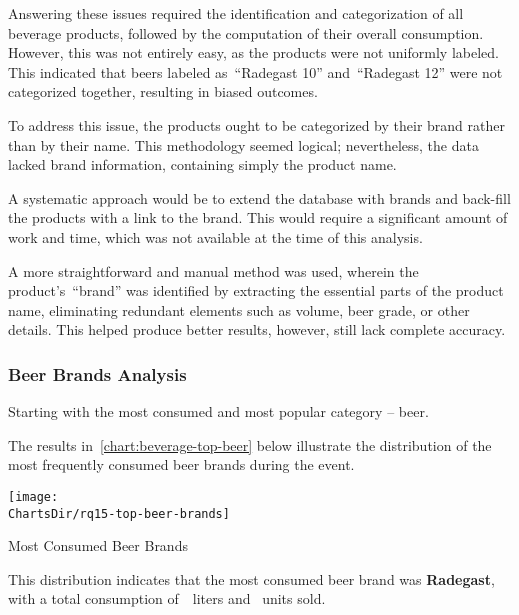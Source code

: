 Answering these issues required the identification and categorization of all beverage products, followed by the computation of their overall consumption.
However, this was not entirely easy, as the products were not uniformly labeled.
This indicated that beers labeled as~\enquote{Radegast 10} and~\enquote{Radegast 12} were not categorized together, resulting in biased outcomes.

To address this issue, the products ought to be categorized by their brand rather than by their name.
This methodology seemed logical; nevertheless, the data lacked brand information, containing simply the product name.

A systematic approach would be to extend the database with brands and back-fill the products with a link to the brand.
This would require a significant amount of work and time, which was not available at the time of this analysis.

A more straightforward and manual method was used, wherein the product's~\enquote{brand} was identified by extracting the essential parts of the product name, eliminating redundant elements such as volume, beer grade, or other details.
This helped produce better results, however, still lack complete accuracy.


\subsubsection{Beer Brands Analysis}
\label{subsubsec:analysis-beverage-popular-beer}
Starting with the most consumed and most popular category – beer.


The results in~\autoref{chart:beverage-top-beer} below illustrate the distribution of the most frequently consumed beer brands during the event.

\begin{chart}[H]
	\centering
	\texttt{[image: \\ChartsDir/rq15-top-beer-brands]}
	\caption{ Most Consumed Beer Brands}
	\label{chart:beverage-top-beer}
	\source
\end{chart}

This distribution indicates that the most consumed beer brand was \textbf{Radegast}, with a total consumption of~~liters and~ units sold.

